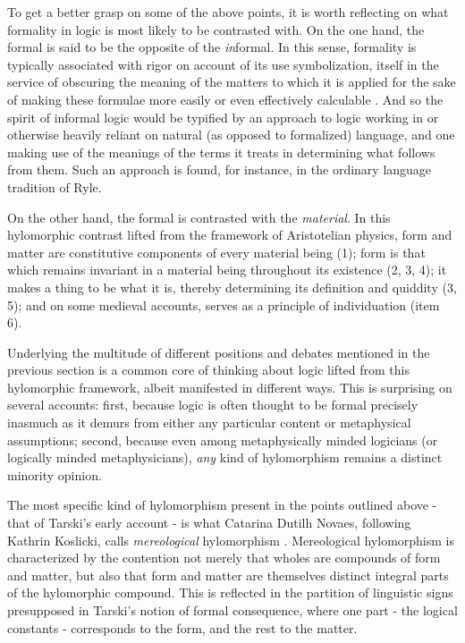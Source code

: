 		To get a better grasp on some of the above points, it is worth reflecting on what formality in logic is most likely to be contrasted with. On the one hand, the formal is said to be the opposite of the \textit{in}formal. In this sense, formality is typically associated with rigor on account of its use symbolization, itself in the service of obscuring the meaning of the matters to which it is applied for the sake of making these formulae more easily or even effectively calculable \cite[321-325]{DutilhNovaes2011}. And so the spirit of informal logic would be typified by an approach to logic working in or otherwise heavily reliant on natural (as opposed to formalized) language, and one making use of the meanings of the terms it treats in determining what follows from them. Such an approach is found, for instance, in the ordinary language tradition of Ryle.
		
		On the other hand, the formal is contrasted with the \textit{material}. In this hylomorphic contrast lifted from the framework of Aristotelian physics, form and matter are constitutive components of every material being (1); form is that which remains invariant in a material being throughout its existence (2, 3, 4); it makes a thing to be what it is, thereby determining its definition and quiddity (3, 5); and on some medieval accounts, serves as a principle of individuation (item 6).
		
		Underlying the multitude of different positions and debates mentioned in the previous section is a common core of thinking about logic lifted from this hylomorphic framework, albeit manifested in different ways. This is surprising on several accounts: first, because logic is often thought to be formal precisely inasmuch as it demurs from either any particular content or metaphysical assumptions; second, because even among metaphysically minded logicians (or logically minded metaphysicians), \textit{any} kind of hylomorphism remains a distinct minority opinion.
		
		The most specific kind of hylomorphism present in the points outlined above - that of Tarski's early account - is what Catarina Dutilh Novaes, following Kathrin Koslicki, calls \textit{mereological} hylomorphism \cite{DutilhNovaes2012b} \cite{Koslicki2006}. Mereological hylomorphism is characterized by the contention not merely that wholes are compounds of form and matter, but also that form and matter are themselves distinct integral parts of the hylomorphic compound. This is reflected in the partition of linguistic signs presupposed in Tarski's notion of formal consequence, where one part - the logical constants  - corresponds to the form, and the rest to the matter.
		
